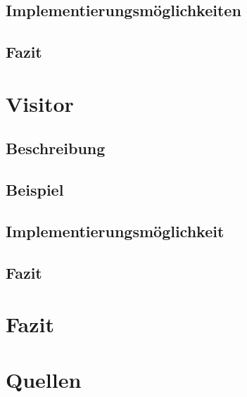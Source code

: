 \documentclass[a4paper,11pt]{scrartcl}
\begin{document}
\subsection{Implementierungsmöglichkeiten}

\subsection{Fazit}


\section{Visitor}

\subsection{Beschreibung}

\subsection{Beispiel}

\subsection{Implementierungsmöglichkeit}

\subsection{Fazit}


\section{Fazit}


\section{Quellen}

\end{document}
